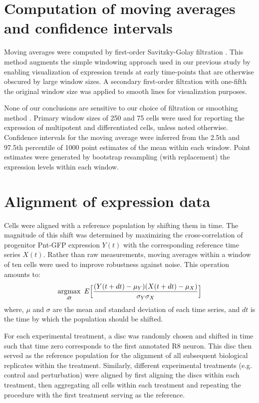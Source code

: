 \section{Computation of moving averages and confidence intervals}
\label{appendix:ratio:moving_averages}

Moving averages were computed by first-order Savitzky-Golay filtration \cite{Savitzky1964}. This method augments the simple windowing approach used in our previous study \cite{Pelaez2015a} by enabling visualization of expression trends at early time-points that are otherwise obscured by large window sizes. A secondary first-order filtration with one-fifth the original window size was applied to smooth lines for visualization purposes.

None of our conclusions are sensitive to our choice of filtration or smoothing method \cite{Pelaez2015a}. Primary window sizes of 250 and 75 cells were used for reporting the expression of multipotent and differentiated cells, unless noted otherwise. Confidence intervals for the moving average were inferred from the 2.5th and 97.5th percentile of 1000 point estimates of the mean within each window. Point estimates were generated by bootstrap resampling (with replacement) the expression levels within each window.

\section{Alignment of expression data}
\label{appendix:ratio:alignment}

Cells were aligned with a reference population by shifting them in time. The magnitude of this shift was determined by maximizing the cross-correlation of progenitor Pnt-GFP expression $Y(t)$ with the corresponding reference time series $X(t)$. Rather than raw measurements, moving averages within a window of ten cells were used to improve robustness against noise. This operation amounts to:
\begin{equation}
\operatorname*{\arg\!\max}_{dt} \ { E \Big[ \frac{(Y(t+dt)-\mu_Y)(X(t+dt)-\mu_X)}{\sigma_Y \sigma_X} \Big] }
\end{equation}
where, $\mu$ and $\sigma$ are the mean and standard deviation of each time series, and $dt$ is the time by which the population should be shifted.

For each experimental treatment, a disc was randomly chosen and shifted in time such that time zero corresponds to the first annotated R8 neuron. This disc then served as the reference population for the alignment of all subsequent biological replicates within the treatment. Similarly, different experimental treatments (e.g. control and perturbation) were aligned by first aligning the discs within each treatment, then aggregating all cells within each treatment and repeating the procedure with the first treatment serving as the reference.

